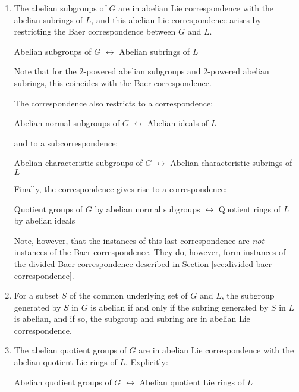 \begin{enumerate}
\item The abelian subgroups of $G$ are in abelian Lie correspondence
  with the abelian subrings of $L$, and this abelian Lie
  correspondence arises by restricting the Baer correspondence between
  $G$ and $L$.

  \begin{center}
    Abelian subgroups of $G$ $\leftrightarrow$ Abelian subrings of $L$
  \end{center}

  Note that for the $2$-powered abelian subgroups and $2$-powered
  abelian subrings, this coincides with the Baer correspondence.

  The correspondence also restricts to a correspondence:

  \begin{center}
    Abelian normal subgroups of $G$ $\leftrightarrow$ Abelian ideals of $L$
  \end{center}

  and to a subcorrespondence:

  \begin{center}
    Abelian characteristic subgroups of $G$ $\leftrightarrow$ Abelian
    characteristic subrings of $L$
  \end{center}

  Finally, the correspondence gives rise to a correspondence:

  \begin{center}
    Quotient groups of $G$ by abelian normal subgroups $\leftrightarrow$ Quotient rings of $L$ by abelian ideals
  \end{center}

  Note, however, that the instances of this last correspondence are
  {\em not} instances of the Baer correspondence. They do, however,
  form instances of the divided Baer correspondence described in
  Section \ref{sec:divided-baer-correspondence}.
\item For a subset $S$ of the common underlying set of $G$ and $L$,
  the subgroup generated by $S$ in $G$ is abelian if and only if the
  subring generated by $S$ in $L$ is abelian, and if so, the subgroup
  and subring are in abelian Lie correspondence.
\item The abelian quotient groups of $G$ are in abelian Lie
  correspondence with the abelian quotient Lie rings of $L$. Explicitly:

  \begin{center}
    Abelian quotient groups of $G$ $\leftrightarrow$ Abelian quotient Lie rings of $L$
  \end{center}


\end{enumerate}
